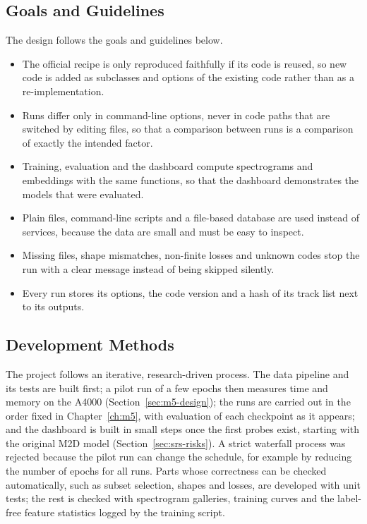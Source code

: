 \documentclass{FastFyp}
\begin{document}
\subsection{Goals and Guidelines}
The design follows the goals and guidelines below.
\begin{itemize}
  \item The official recipe is only reproduced faithfully if its code is reused, so new code is added as subclasses and options of the existing code rather than as a re-implementation.
  \item Runs differ only in command-line options, never in code paths that are switched by editing files, so that a comparison between runs is a comparison of exactly the intended factor.
  \item Training, evaluation and the dashboard compute spectrograms and embeddings with the same functions, so that the dashboard demonstrates the models that were evaluated.
  \item Plain files, command-line scripts and a file-based database are used instead of services, because the data are small and must be easy to inspect.
  \item Missing files, shape mismatches, non-finite losses and unknown codes stop the run with a clear message instead of being skipped silently.
  \item Every run stores its options, the code version and a hash of its track list next to its outputs.
\end{itemize}

\subsection{Development Methods}
The project follows an iterative, research-driven process. The data pipeline and its tests are built first; a pilot run of a few epochs then measures time and memory on the A4000 (Section~\ref{sec:m5-design}); the runs are carried out in the order fixed in Chapter~\ref{ch:m5}, with evaluation of each checkpoint as it appears; and the dashboard is built in small steps once the first probes exist, starting with the original M2D model (Section~\ref{sec:srs-risks}). A strict waterfall process was rejected because the pilot run can change the schedule, for example by reducing the number of epochs for all runs. Parts whose correctness can be checked automatically, such as subset selection, shapes and losses, are developed with unit tests; the rest is checked with spectrogram galleries, training curves and the label-free feature statistics logged by the training script.
\end{document}
